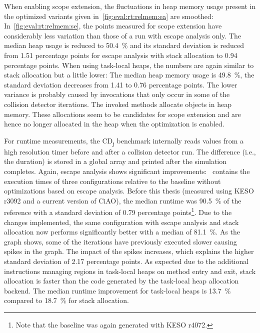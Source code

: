 		When enabling scope extension, the fluctuations in heap memory usage present in the optimized variants given
		in~\cref{fig:eval:rt:relmem:ea} are smoothed: In~\cref{fig:eval:rt:relmem:se}, the points measured for scope
		extension have considerably less variation than those of a run with escape analysis only. The median heap usage is
		reduced to 50.4~\% and its standard deviation is reduced from 1.51 percentage points for escape analysis with stack
		allocation to 0.94 percentage points. When using task-local heaps, the numbers are again similar to stack allocation
		but a little lower: The median heap memory usage is 49.8~\%, the standard deviation decreases from 1.41 to 0.76
		percentage points. The lower variance is probably caused by invocations that only occur in some of the collision
		detector iterations. The invoked methods allocate objects in heap memory. These allocations seem to be candidates
		for scope extension and are hence no longer allocated in the heap when the optimization is enabled.

		For runtime measurements, the CD\textsubscript{j} benchmark internally reads values from a high resolution timer
		before and after a collision detector run. The difference (i.e., the duration) is stored in a global array and
		printed after the simulation completes. Again, escape analysis shows significant
		improvements:~ contains the execution times of three configurations relative to the
		baseline without optimizations based on escape analysis. Before this thesis (measured using KESO r3092 and a current
		version of CiAO), the median runtime was 90.5~\% of the reference with a standard deviation of 0.79 percentage
		points\footnote{Note that the baseline was again generated with KESO r4072.}. Due to the changes implemented, the
		same configuration with escape analysis and stack allocation now performs significantly better with a median of
		81.1~\%. As the graph shows, some of the iterations have previously executed slower causing spikes in the graph. The
		impact of the spikes increases, which explains the higher standard deviation of 2.17 percentage points. As expected
		due to the additional instructions managing regions in task-local heaps on method entry and exit, stack allocation
		is faster than the code generated by the task-local heap allocation backend. The median runtime improvement for
		task-local heaps is 13.7~\% compared to 18.7~\% for stack allocation.

